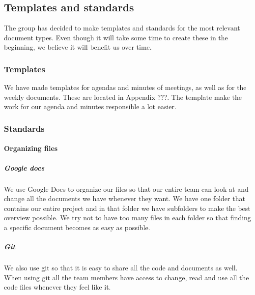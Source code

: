 \subsection{Templates and standards}
The group has decided to make templates and standards for the most relevant document types. Even though it will take some time to create these in the beginning, we believe it will benefit us over time.

\subsubsection{Templates}
We have made templates for agendas and minutes of meetings, as well as for the weekly documents. These are located in Appendix ???. The template make the work for our agenda and minutes responsible a lot easier.

\subsubsection{Standards}

\paragraph{Organizing files}
\subparagraph{Google docs}\hfill
\newline
We use Google Docs to organize our files so that our entire team can look at and change all the documents we have whenever they want. We have one folder that contains our entire project and in that folder we have subfolders to make the best overview possible. We try not to have too many files in each folder so that finding a specific document becomes as easy as possible.

\subparagraph{Git}\hfill 
\newline
We also use git so that it is easy to share all the code and documents as well. When using \gls{git} all the team members have access to change, read and use all the code files whenever they feel like it.

\newpage

